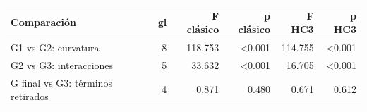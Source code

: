 \begin{tabular}{lrrrrr}
\toprule
Comparación & gl & F clásico & p clásico & F HC3 & p HC3 \\
\midrule
G1 vs G2: curvatura & 8 & 118.753 & <0.001 & 114.755 & <0.001 \\
G2 vs G3: interacciones & 5 & 33.632 & <0.001 & 16.705 & <0.001 \\
G final vs G3: términos retirados & 4 & 0.871 & 0.480 & 0.671 & 0.612 \\
\bottomrule
\end{tabular}
